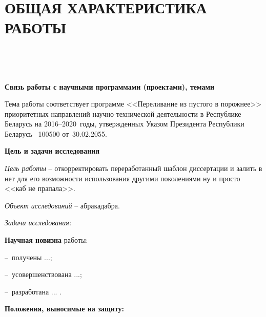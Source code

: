 
\chapter*{\normalsize ОБЩАЯ ХАРАКТЕРИСТИКА РАБОТЫ} ~
~

\vspace{-16pt}
\textbf{Связь работы с научными программами (проектами), темами}

Тема работы соответствует программе <<Переливание из пустого в порожнее>> приоритетных направлений научно-технической деятельности в Республике Беларусь на \mbox{2016--2020}~годы, утвержденных Указом Президента Республики Беларусь  \textnumero ~100500 от~30.02.2055.


\textbf{Цель и задачи исследования}

\textit{Цель работы}
-- откорректировать переработанный шаблон диссертации и залить в нет для его возможности использования другими поколениями ну и просто <<каб не прапала>>.

\textit{Объект исследований} -- абракадабра.

\textit{Задачи исследования:}

%

%
\textbf{Научная новизна} работы:

--~получены ...;

--~усовершенствована ...;

--~разработана ... .



\textbf{Положения, выносимые на защиту:}

